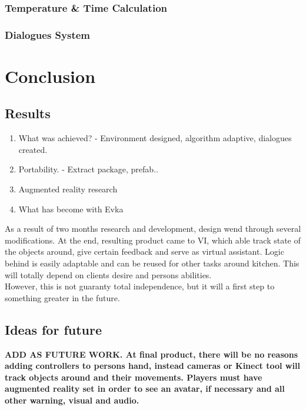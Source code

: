 \documentclass[18pt]{article}
\numberwithin{equation}{section} %
\numberwithin{figure}{section} %
\numberwithin{table}{section} %
\begin{document}
	\subsubsection{Temperature \& Time Calculation}
	\subsubsection{Dialogues System}
	
\section{Conclusion}
	\subsection{Results}
		
		\begin{enumerate}
			\item What was achieved? - Environment designed, algorithm adaptive, dialogues created.
			\item Portability. - Extract package, prefab..
			\item Augmented reality research
			\item What has become with Evka
		\end{enumerate}
		
		As a result of two months research and development, design wend through several modifications. At the end, resulting product came to VI, which able track state of the objects around, give certain feedback and serve as virtual assistant. Logic behind is easily adaptable and can be reused for other tasks around kitchen. This will totally depend on clients desire and persons abilities. \\
		
		However, this is not  guaranty total independence, but it will a first step to something greater in the future. \\
		
	\subsection{Ideas for future}	
		\textbf{ ADD AS FUTURE WORK. At final product, there will be no reasons adding controllers to persons hand, instead cameras or Kinect tool will track objects around and their movements.  Players must have augmented reality set in order to see an avatar, if necessary and all other warning, visual and audio.} \\
	
\end{document}
